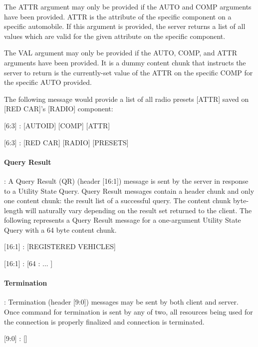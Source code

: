 The ATTR argument may only be provided if the AUTO and COMP arguments have been provided. ATTR is the attribute of the specific component on a specific automobile. If this argument is provided, the server returns a list of all values which are valid for the given attribute on the specific component.

The VAL argument may only be provided if the AUTO, COMP, and ATTR arguments have been provided. It is a dummy content chunk that instructs the server to return  is the currently-set value of the ATTR on the specific COMP for the specific AUTO provided.

The following message would provide a list of all radio presets [ATTR] saved on [RED CAR]'s [RADIO] component:

\begin{center}
{\textsf{[6:3] : [AUTOID] [COMP] [ATTR]}}

{\textsf{[6:3] : [RED CAR] [RADIO] [PRESETS]}}
\end{center}

\paragraph{Query Result}: A Query Result (QR) (header [16:1]) message is sent by the server in response to a Utility State Query. Query Result messages contain a  header chunk and only one content chunk: the result list of a successful query. The content chunk byte-length will naturally vary depending on the result set returned to the client. The following represents a Query Result message for a one-argument Utility State Query with a 64 byte content chunk.

\begin{center}
{\textsf{[16:1] : [REGISTERED VEHICLES]}}

{\textsf{[16:1] : [64 : ... ]}}
\end{center}


\paragraph{Termination}: Termination (header [9:0]) messages may be sent by both client and server. Once command for termination is sent by any of two, all resources being used for the connection is properly finalized and connection is terminated.

\begin{center}
{\textsf{[9:0] : []}}
\end{center}



